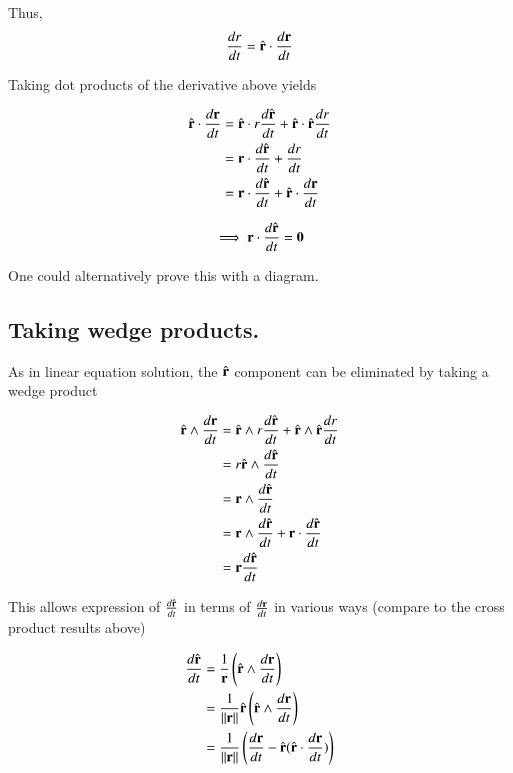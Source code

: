 \documentclass{article}      %
\newcommand{\dt}[1]{\frac{d {#1}}{dt}}
\begin{document}
Thus,
\[
\dt{r} = \rcap \cdot \dt{\Br}
\]

Taking dot products of the derivative above yields

\begin{align*}
\rcap \cdot \dt{\Br} &= \rcap \cdot r \dt{\rcap} + \rcap \cdot \rcap \dt{r} \\
                            &= \Br \cdot \dt{\rcap} + \dt{r} \\
                            &= \Br \cdot \dt{\rcap} + \rcap \cdot \dt{\Br}
\end{align*}

\[
\implies
\Br \cdot \dt{\rcap} = \Bzero
\]

One could alternatively prove this with a diagram.


\subsection{Taking wedge products.}

As in linear equation solution, the $\hat{\mathbf{r}}$ component can be eliminated by taking a wedge product

\begin{align*}
\rcap \wedge \dt{\Br} &= \rcap \wedge r \dt{\rcap} + \rcap \wedge \rcap \dt{r} \\
                             &= r \rcap \wedge \dt{\rcap} \\
                             &= \Br \wedge \dt{\rcap}  \\
                             &= \Br \wedge \dt{\rcap} + \Br \cdot \dt{\rcap} \\
                             &= \Br \dt{\rcap}
\end{align*}

This allows expression of $\dt{\rcap}$ in terms of $\dt{\Br}$ in various ways (compare to the cross product results above)

\begin{align*}
\dt{\rcap} &= \frac{1}{{ \Br }}\left(\rcap \wedge \dt{\Br}\right) \\
                   &= \frac{1}{\Vert \Br \Vert}{     {\rcap} \left(\rcap \wedge \dt{\Br}\right)       } \\
                   &= \frac{1}{\Vert \Br \Vert}\left({ \dt{\Br} - \rcap (\rcap \cdot \dt{\Br}) }\right) \\
\end{align*}
\end{document}
